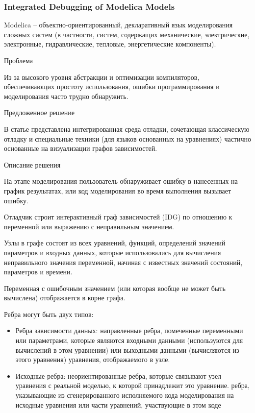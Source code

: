 \subsubsection{Integrated Debugging of Modelica Models}

Modelica -- объектно-ориентированный, декларативный язык моделирования сложных систем (в частности, систем, содержащих механические, электрические, электронные, гидравлические, тепловые, энергетические компоненты). 
\newline

Проблема

Из за высокого уровня абстракции и оптимизации компиляторов, обеспечивающих простоту использования, ошибки программирования и моделирования часто трудно обнаружить.
\newline

Предложенное решение

В статье представлена интегрированная среда отладки, сочетающая классическую отладку и специальные техники (для языков основанных на уравнениях) частично основанные на визуализации графов зависимостей.
\newline

Описание решения

На этапе моделирования пользователь обнаруживает ошибку в нанесенных на график результатах, или код моделирования во время выполнения вызывает ошибку.

Отладчик строит интерактивный граф зависимостей (IDG) по отношению к переменной или выражению с неправильным значением.

Узлы в графе состоят из всех уравнений, функций, определений значений параметров и входных данных, которые использовались для вычисления неправильного значения переменной, начиная с известных значений состояний, параметров и времени.

Переменная с ошибочным значением (или которая вообще не может быть вычислена) отображается в корне графа.

Ребра могут быть двух типов:
\begin{itemize}
	\item Ребра зависимости данных: направленные ребра, помеченные переменными или параметрами, которые являются входными данными (используются для вычислений в этом уравнении) или выходными данными (вычисляются из этого уравнения) уравнения, отображаемого в узле.
	\item Исходные ребра: неориентированные ребра, которые связывают узел уравнения с реальной моделью, к которой принадлежит это уравнение.
	ребра, указывающие из сгенерированного исполняемого кода моделирования на исходные уравнения или части уравнений, участвующие в этом коде
\end{itemize}


